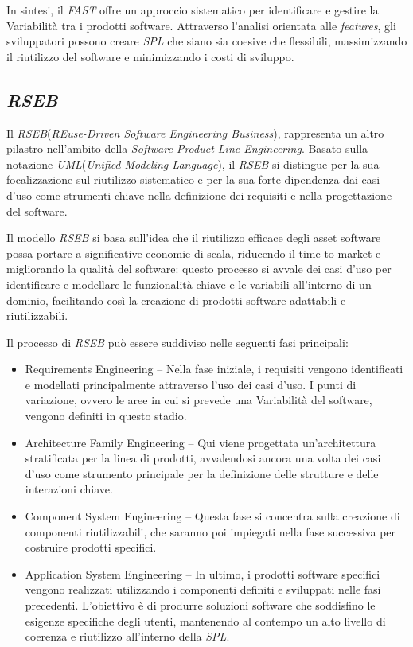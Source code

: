 \documentclass[12pt]{report}
\newcommand{\spl}{\textsl{SPL}\xspace}
\newcommand{\fast}{\textsl{FAST}\xspace}
\newcommand{\rseb}{\textsl{RSEB}\xspace}
\newcommand{\uml}{\textsl{UML}\xspace}
\begin{document}
In sintesi, il \fast offre un approccio sistematico per identificare e gestire la Variabilità tra i prodotti software. Attraverso l'analisi orientata alle \textit{features}, gli sviluppatori possono creare \spl che siano sia coesive che flessibili, massimizzando il riutilizzo del software e minimizzando i costi di sviluppo.


\subsection{\rseb}
Il \rseb (\textit{REuse-Driven Software Engineering Business}), rappresenta un altro pilastro nell'ambito della \textit{Software Product Line Engineering}. Basato sulla notazione \uml (\textit{Unified Modeling Language}), il \rseb si distingue per la sua focalizzazione sul riutilizzo sistematico e per la sua forte dipendenza dai casi d'uso come strumenti chiave nella definizione dei requisiti e nella progettazione del software.

Il modello \rseb si basa sull'idea che il riutilizzo efficace degli asset software possa portare a significative economie di scala, riducendo il time-to-market e migliorando la qualità del software: questo processo si avvale dei casi d'uso per identificare e modellare le funzionalità chiave e le variabili all'interno di un dominio, facilitando così la creazione di prodotti software adattabili e riutilizzabili.

Il processo di \rseb può essere suddiviso nelle seguenti fasi principali:

\begin{itemize}
\item \textsf{Requirements Engineering} -- Nella fase iniziale, i requisiti vengono identificati e modellati principalmente attraverso l'uso dei casi d'uso. I punti di variazione, ovvero le aree in cui si prevede una Variabilità del software, vengono definiti in questo stadio.
\item \textsf{Architecture Family Engineering} -- Qui viene progettata un'architettura stratificata per la linea di prodotti, avvalendosi ancora una volta dei casi d'uso come strumento principale per la definizione delle strutture e delle interazioni chiave.
\item \textsf{Component System Engineering} -- Questa fase si concentra sulla creazione di componenti riutilizzabili, che saranno poi impiegati nella fase successiva per costruire prodotti specifici.
\item \textsf{Application System Engineering} -- In ultimo, i prodotti software specifici vengono realizzati utilizzando i componenti definiti e sviluppati nelle fasi precedenti. L'obiettivo è di produrre soluzioni software che soddisfino le esigenze specifiche degli utenti, mantenendo al contempo un alto livello di coerenza e riutilizzo all'interno della \spl.
\end{itemize}
\end{document}

